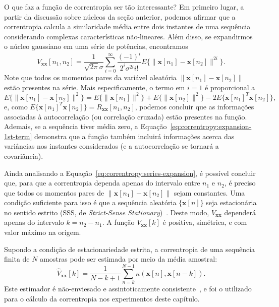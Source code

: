 O que faz a função de correntropia ser tão interessante? Em primeiro lugar, a partir da discussão sobre núcleos da seção anterior, podemos afirmar que a correntropia calcula a similaridade média entre dois instantes de uma sequência considerando complexas características não-lineares. Além disso, se expandirmos o núcleo gaussiano em uma série de potências, encontramos
\begin{equation}
    V_{\textbf{x}\textbf{x}}[n_1, n_2] = \frac{1}{\sqrt{2\pi}\sigma} \sum_{i=0}^\infty \frac{(-1)^i}{2^i \sigma^{2i} i!} E\{ \lVert \mathbf{x}[n_1] - \mathbf{x}[n_2] \rVert^{2i} \}.
    \label{eq:correntropy:series-expansion}
\end{equation}
Note que todos os momentos pares da variável aleatória $\lVert\mathbf{x}[n_1] - \mathbf{x}[n_2]\rVert$ estão presentes na série. Mais especificamente, o termo em $i=1$ é proporcional a
\begin{equation}
    E\{ \lVert \mathbf{x}[n_1] - \mathbf{x}[n_2] \rVert^2 \} = E\{ \lVert \mathbf{x}[n_1] \rVert^2 \} + E\{ \lVert \mathbf{x}[n_2] \rVert ^2 \} - 2 E\{ \mathbf{x}[n_1]^T \mathbf{x}[n_2]\},
    \label{eq:correntropy:expansion-1st-term}
\end{equation}
e, como $E\{ \mathbf{x}[n_1]^T \mathbf{x}[n_2] \} = R_{\mathbf{x}\mathbf{x}}[n_1, n_2]$, podemos concluir que as informações associadas à autocorrelação (ou correlação cruzada) estão presentes na função. Ademais, se a sequência tiver média zero, a Equação~\eqref{eq:correntropy:expansion-1st-term} demonstra que a função também incluirá informações acerca das variâncias nos instantes considerados (e a autocorrelação se tornará a covariância).

Ainda analisando a Equação~\eqref{eq:correntropy:series-expansion}, é possível concluir que, para que a correntropia dependa apenas do intervalo entre $n_1$ e $n_2$, é preciso que todos os momentos pares de $\lVert\mathbf{x}[n_1] - \mathbf{x}[n_2]\rVert$ sejam constantes. Uma condição suficiente para isso é que a sequência aleatória $\{\mathbf{x}[n]\}$ seja estacionária no sentido estrito (SSS, de \textit{Strict-Sense Stationary})~\cite{peebles-1987}. Deste modo, $V_{\textbf{x}\textbf{x}}$ dependerá apenas do intervalo $k = n_2 - n_1$. A função $V_{\textbf{x}\textbf{x}}[k]$ é positiva, simétrica, e com valor máximo na origem.

Supondo a condição de estacionariedade estrita, a correntropia de uma sequência finita de $N$ amostras pode ser estimada por meio da média amostral:
\begin{equation}
    \hat{V}_{\textbf{x}\textbf{x}}[k] = \frac{1}{N - k + 1} \sum_{n=k}^{N-1} \kappa(\textbf{x}[n], \textbf{x}[n-k]).
\end{equation}
Este estimador é não-enviesado e assintoticamente consistente~\cite{santamaria-2006}, e foi o utilizado para o cálculo da correntropia nos experimentos deste capítulo.

